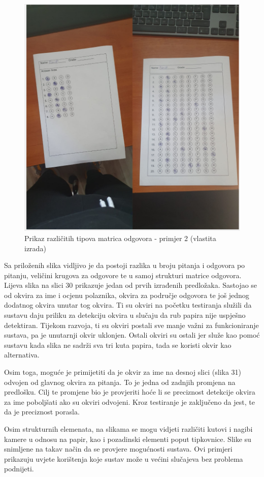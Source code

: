 \documentclass{foi}
\begin{document}
\begin{figure}[H]
\centering
\includegraphics[width=0.8\linewidth]{slike/Test2.png}
\caption{Prikaz različitih tipova matrica odgovora - primjer 2 (vlastita izrada)}
\end{figure}

Sa priloženih slika vidljivo je da postoji razlika u broju pitanja i odgovora po pitanju, veličini krugova za odgovore te u samoj strukturi matrice odgovora. Lijeva slika na slici 30 prikazuje jedan od prvih izrađenih predložaka. Sastojao se od okvira za ime i ocjenu polaznika, okvira za područje odgovora te još jednog dodatnog okvira unutar tog okvira. Ti su okviri na početku testiranja služili da sustavu daju priliku za detekciju okvira u slučaju da rub papira nije uspješno detektiran. Tijekom razvoja, ti su okviri postali sve manje važni za funkcioniranje sustava, pa je unutarnji okvir uklonjen. Ostali okviri su ostali jer služe kao pomoć sustavu kada slika ne sadrži sva tri kuta papira, tada se koristi okvir kao alternativa.

Osim toga, moguće je primijetiti da je okvir za ime na desnoj slici (slika 31) odvojen od glavnog okvira za pitanja. To je jedna od zadnjih promjena na predlošku. Cilj te promjene bio je provjeriti hoće li se preciznost detekcije okvira za ime poboljšati ako su okviri odvojeni. Kroz testiranje je zaključeno da jest, te da je preciznost porasla.

Osim strukturnih elemenata, na slikama se mogu vidjeti različiti kutovi i nagibi kamere u odnosu na papir, kao i pozadinski elementi poput tipkovnice. Slike su snimljene na takav način da se provjere mogućnosti sustava. Ovi primjeri prikazuju uvjete korištenja koje sustav može u većini slučajeva bez problema podnijeti.
\end{document}

